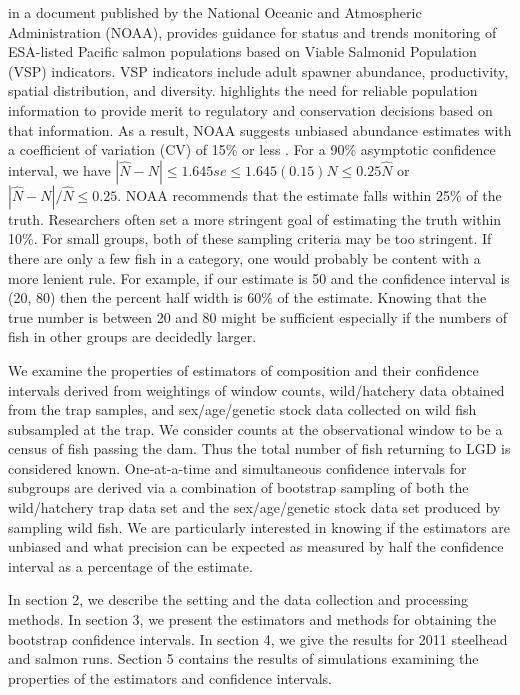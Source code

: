 \documentclass[11pt]{article}
\begin{document}
 in a document published by the National Oceanic and Atmospheric Administration (NOAA), provides guidance for status and trends monitoring of ESA-listed Pacific salmon populations based on Viable Salmonid Population (VSP) indicators. VSP indicators include adult spawner abundance, productivity, spatial distribution, and diversity.  highlights the need for reliable population information to provide merit to regulatory and conservation decisions based on that information. As a result, NOAA suggests unbiased abundance estimates with a coefficient of variation (CV) of 15\% or less \cite{Crawford2011}. For a 90\% asymptotic confidence interval, we have $ |\hat{N}-N|\le 1.645se\le 1.645(0.15)\hat{N}\le 0.25\hat{N}$ or $ |\hat{N}-N|/\hat{N}\le 0.25$.  NOAA recommends that the estimate falls within 25\% of the truth. Researchers often set a more stringent goal of estimating the truth within 10\%.  For small groups, both of these sampling criteria may be too stringent.  If there are only a few fish in a category, one would probably be content with a more lenient rule. For example, if our estimate is 50 and the confidence interval is (20, 80) then the percent half width is 60\% of the estimate. Knowing that the true number is between 20 and 80 might be sufficient especially if the numbers of fish in other groups are decidedly larger.

We examine the properties of estimators of composition and their confidence intervals derived from weightings of window counts, wild/hatchery data obtained from the trap samples, and sex/age/genetic stock data collected on wild fish subsampled at the trap. We consider counts at the observational window to be a census of fish passing the dam. Thus the total number of fish returning to LGD is considered known.  One-at-a-time and simultaneous confidence intervals for subgroups are derived via a combination of bootstrap sampling of both the wild/hatchery trap data set and the sex/age/genetic stock data set produced by sampling wild fish.  We are particularly interested in knowing if the estimators are unbiased and what precision can be expected as measured by half the confidence interval as a percentage of the estimate.

In section 2, we describe the setting and the data collection and processing methods. In section 3, we present the estimators and methods for obtaining the bootstrap confidence intervals. In section 4, we give the results for 2011 steelhead and salmon runs. Section 5 contains the results of simulations examining the properties of the estimators and confidence intervals.
\end{document}
